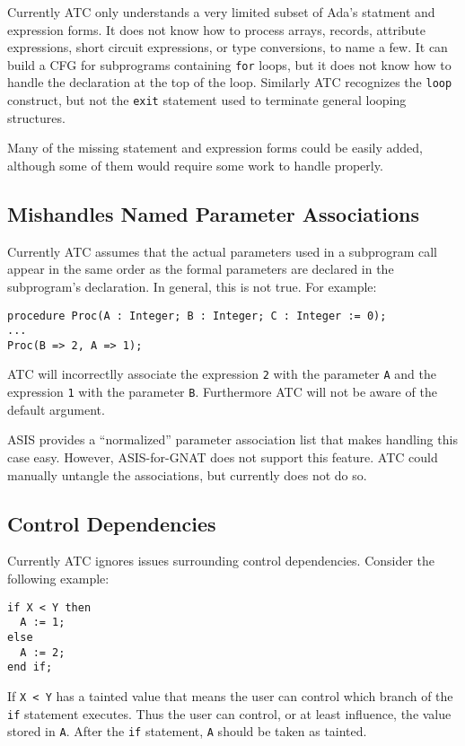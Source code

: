 \documentclass{article}
\begin{document}
Currently ATC only understands a very limited subset of Ada's statment and expression forms. It does not know how to process arrays, records, attribute expressions, short circuit expressions, or type conversions, to name a few. It can build a CFG for subprograms containing \texttt{for} loops, but it does not know how to handle the declaration at the top of the loop. Similarly ATC recognizes the \texttt{loop} construct, but not the \texttt{exit} statement used to terminate general looping structures.

Many of the missing statement and expression forms could be easily added, although some of them would require some work to handle properly.

\subsection{Mishandles Named Parameter Associations}

Currently ATC assumes that the actual parameters used in a subprogram call appear in the same order as the formal parameters are declared in the subprogram's declaration. In general, this is not true. For example:

\begin{verbatim}
procedure Proc(A : Integer; B : Integer; C : Integer := 0);
...
Proc(B => 2, A => 1);
\end{verbatim}

ATC will incorrectlly associate the expression \texttt{2} with the parameter \texttt{A} and the expression \texttt{1} with the parameter \texttt{B}. Furthermore ATC will not be aware of the default argument.

ASIS provides a ``normalized'' parameter association list that makes handling this case easy. However, ASIS-for-GNAT does not support this feature. ATC could manually untangle the associations, but currently does not do so.

\subsection{Control Dependencies}

Currently ATC ignores issues surrounding control dependencies. Consider the following example:

\begin{verbatim}
if X < Y then
  A := 1;
else
  A := 2;
end if;
\end{verbatim}

If \texttt{X < Y} has a tainted value that means the user can control which branch of the \texttt{if} statement executes. Thus the user can control, or at least influence, the value stored in \texttt{A}. After the \texttt{if} statement, \texttt{A} should be taken as tainted.
\end{document}
